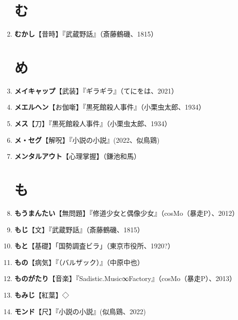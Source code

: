 \documentclass[twocolumn]{jsbook}
\begin{document}
\begin{enumerate}
\section*{む}
    \item \textbf{むかし}【昔時】『武蔵野話』（斎藤鶴磯、1815）
\section*{め}
    \item \textbf{メイキャップ}【武装】『ギラギラ』（てにをは、2021）
    \item \textbf{メエルヘン}【お伽噺】『黒死館殺人事件』（小栗虫太郎、1934）
    \item \textbf{メス}【刀】『黒死館殺人事件』（小栗虫太郎、1934）
    \item \textbf{メ・セグ}【解呪】『小説の小説』(2022、似鳥鶏)
    \item \textbf{メンタルアウト}【心理掌握】（鎌池和馬）
\section*{も}
    \item \textbf{もうまんたい}【無問題】『修道少女と偶像少女』（cosMo（暴走P）、2012）
    \item \textbf{もじ}【文】『武蔵野話』（斎藤鶴磯、1815）
    \item \textbf{もと}【基礎】「国勢調査ビラ」（東京市役所、1920?）
    \item \textbf{もの}【病気】『（バルザック）』（中原中也）
    \item \textbf{ものがたり}【音楽】『Sadistic.Music∞Factory』（cosMo（暴走P）、2013）
    \item \textbf{もみじ}【紅葉】◇
    \item \textbf{モンド}【尺】『小説の小説』(似鳥鶏、2022)

\end{enumerate}
\end{document}
